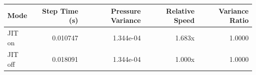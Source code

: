 \begin{tabular}{lrrrr}
\toprule
Mode & Step Time (s) & Pressure Variance & Relative Speed & Variance Ratio \\
\midrule
JIT on & 0.010747 & 1.344e-04 & 1.683x & 1.0000 \\
JIT off & 0.018091 & 1.344e-04 & 1.000x & 1.0000 \\
\bottomrule
\end{tabular}
